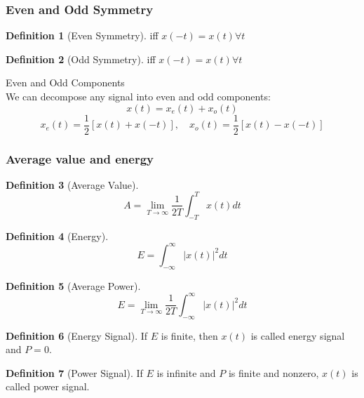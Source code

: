 \documentclass{article}
\theoremstyle{definition}
\newtheorem{definition}{Definition}[subsection]
\begin{document}
\subsubsection{Even and Odd Symmetry}
\begin{definition}[Even Symmetry]
    iff $ x(-t) = x(t)\forall t $
\end{definition}
\begin{definition}[Odd Symmetry]
    iff $ x(-t)=x(t)\forall t $
\end{definition}
Even and Odd Components\\
We can decompose any signal into even and odd components:
\begin{equation}
    x(t) = x_e(t)+x_o(t)
\end{equation}
\begin{equation}
    x_e(t)=\frac{1}{2}[x(t)+x(-t)],\quad x_o(t) = \frac{1}{2}[x(t)-x(-t)]
\end{equation}
\subsubsection{Average value and energy}
\begin{definition}[Average Value]
    \begin{equation}
        A = \lim_{T \to \infty} \frac{1}{2T} \int_{-T}^{T}x(t)dt
    \end{equation}
\end{definition}
\begin{definition}[Energy]
    \begin{equation}
        E = \int_{-\infty}^{\infty} |x(t)|^2dt
    \end{equation}
\end{definition}
\begin{definition}[Average Power] 
    \begin{equation}
        E =\lim_{T \to \infty} \frac{1}{2T} \int_{-\infty}^{\infty} |x(t)|^2dt
    \end{equation}
\end{definition}
\begin{definition}[Energy Signal]
    If $ E $ is finite, then $ x(t) $ is called energy signal and $ P=0 $.
\end{definition}
\begin{definition}[Power Signal]
    If $ E $ is infinite and $ P $ is finite and nonzero, $ x(t) $ is called power signal.
\end{definition}
\end{document}
